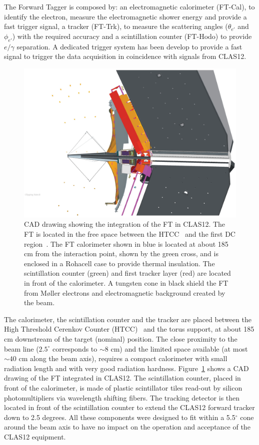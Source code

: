 The Forward Tagger is composed by: 
an electromagnetic calorimeter  (FT-Cal), to identify the
electron, measure the electromagnetic shower energy and provide a fast trigger signal, a tracker (FT-Trk),  to measure the scattering angles ($\theta_{e'}$ and $\phi_{e'}$) with the required accuracy and a  scintillation counter (FT-Hodo) to provide $e/\gamma$ separation. A dedicated trigger system has been develop to provide a fast signal to trigger the data acquisition in coincidence with signals from CLAS12.
\begin{figure}[th!]
\centering 
\includegraphics[width=\columnwidth]{./fig/ft_cad.eps} 
\caption{CAD drawing showing the integration of the FT in CLAS12. The FT is located in the free space between the HTCC~\cite{htcc} and the first DC region~\cite{dc}. The FT calorimeter shown in blue is located at about 185 cm from the interaction point, shown by the green cross, and is enclosed in a Rohacell case to provide thermal insulation. The scintillation counter (green) and first tracker layer (red) are located in front of the calorimeter. A tungsten cone in black shield the FT from M{\o}ller electrons and electromagnetic background created by the beam. } 
\label{fig:calinclas12} 
\end{figure}

The calorimeter, the scintillation counter and the tracker
are placed between the High Threshold Cerenkov Counter (HTCC)~\cite{htcc} and the torus support, at about 185 cm downstream of the target (nominal) position. The close proximity
to the beam line ($2.5^\circ$ corresponds to $\sim 8$ cm) and the limited space available (at most $\sim 40$ cm along the beam axis), requires a compact calorimeter with small radiation length and with very good radiation hardness. Figure~\ref{fig:calinclas12} shows 
a CAD drawing of the FT integrated in CLAS12. 
The scintillation counter, placed in front of the calorimeter, is made of plastic scintillator tiles 
read-out by silicon photomultipliers via wavelength shifting fibers. The tracking detector is then located in front of the scintillation counter to extend the CLAS12 forward tracker down to 2.5 degrees.
All these components were designed to fit within a 5.5$^{\circ}$ cone around the beam axis to have no impact on the operation and acceptance of the CLAS12 equipment.
